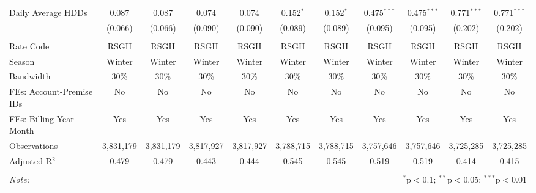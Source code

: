 \begin{table}[!htbp]
\begin{adjustbox}{scale = 0.75}
\begin{tabular}{@{\extracolsep{5pt}}lcccccccccc}
 Daily Average HDDs & 0.087 & 0.087 & 0.074 & 0.074 & 0.152$^{*}$ & 0.152$^{*}$ & 0.475$^{***}$ & 0.475$^{***}$ & 0.771$^{***}$ & 0.771$^{***}$ \\ 
  & (0.066) & (0.066) & (0.090) & (0.090) & (0.089) & (0.089) & (0.095) & (0.095) & (0.202) & (0.202) \\ 
\hline \\[-1.8ex] 
Rate Code & RSGH & RSGH & RSGH & RSGH & RSGH & RSGH & RSGH & RSGH & RSGH & RSGH \\ 
Season & Winter & Winter & Winter & Winter & Winter & Winter & Winter & Winter & Winter & Winter \\ 
Bandwidth & 30\% & 30\% & 30\% & 30\% & 30\% & 30\% & 30\% & 30\% & 30\% & 30\% \\ 
FEs: Account-Premise IDs & No & No & No & No & No & No & No & No & No & No \\ 
FEs: Billing Year-Month & Yes & Yes & Yes & Yes & Yes & Yes & Yes & Yes & Yes & Yes \\ 
Observations & 3,831,179 & 3,831,179 & 3,817,927 & 3,817,927 & 3,788,715 & 3,788,715 & 3,757,646 & 3,757,646 & 3,725,285 & 3,725,285 \\ 
Adjusted R$^{2}$ & 0.479 & 0.479 & 0.443 & 0.444 & 0.545 & 0.545 & 0.519 & 0.519 & 0.414 & 0.415 \\ 
\hline 
\hline \\[-1.8ex] 
\textit{Note:}  & \multicolumn{10}{r}{$^{*}$p$<$0.1; $^{**}$p$<$0.05; $^{***}$p$<$0.01} \\ 
\end{tabular}
\end{adjustbox}
\end{table} 

